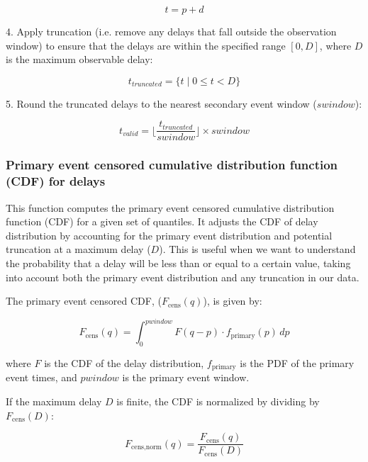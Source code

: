 \documentclass[10pt,letterpaper]{article}
\begin{document}
\begin{equation}t = p + d\end{equation}

4. Apply truncation (i.e. remove any delays that fall outside the observation window) to ensure that the delays are within the specified range $[0, D]$, where $D$ is the maximum observable delay:

\begin{equation}
t_{truncated} = \{t \mid 0 \leq t < D\}
\end{equation}

5. Round the truncated delays to the nearest secondary event window ($swindow$):

\begin{equation}t_{valid} = \lfloor \frac{t_{truncated}}{swindow} \rfloor \times swindow\end{equation}

\subsubsection{Primary event censored cumulative distribution function (CDF) for delays}

This function computes the primary event censored cumulative distribution function (CDF) for a given set of quantiles. It adjusts the CDF of delay distribution by accounting for the primary event distribution and potential truncation at a maximum delay ($D$). This is useful when we want to understand the probability that a delay will be less than or equal to a certain value, taking into account both the primary event distribution and any truncation in our data.

The primary event censored CDF, ($F_{\text{cens}}(q)$), is given by:

\begin{equation}
F_{\text{cens}}(q) = \int_{0}^{pwindow} F(q - p) \cdot f_{\text{primary}}(p) \, dp
\end{equation}

where $F$ is the CDF of the delay distribution, $f_{\text{primary}}$ is the PDF of the primary event times, and $pwindow$ is the primary event window.

If the maximum delay $D$ is finite, the CDF is normalized by dividing by $F_{\text{cens}}(D)$:

\begin{equation}
F_{\text{cens,norm}}(q) = \frac{F_{\text{cens}}(q)}{F_{\text{cens}}(D)}
\end{equation}
\end{document}
